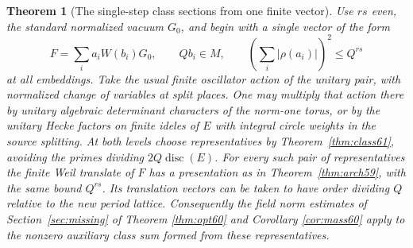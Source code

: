 \documentclass[a4paper,11pt]{article}
\newtheorem{theorem}[proposition]{Theorem}
\theoremstyle{definition}
\theoremstyle{remark}
\numberwithin{equation}{section}
\begin{document}
\begin{theorem}[The single-step class sections from one finite vector]\label{thm:one61}
Use \(rs\) even, the standard normalized vacuum \(G_0\), and
begin with a single vector of the form
\[
       F=\sum_i a_i W(b_i)G_0,\qquad Q b_i\in M,\qquad
                  \left(\sum_i|\rho(a_i)|\right)^2\le Q^{rs}
\]
at all embeddings. Take the usual finite oscillator action of
the unitary pair, with normalized change of variables at split
places. One may multiply that action there by unitary algebraic
determinant characters of the norm-one torus, or by the unitary
Hecke factors on finite ideles of \(E\) with integral circle
weights in the source splitting. At both levels choose representatives by
Theorem~\ref{thm:class61}, avoiding the primes dividing
\(2Q\operatorname{disc}(E)\). For every such pair of representatives
the finite Weil translate of \(F\) has a presentation as in
Theorem~\ref{thm:arch59}, with the same bound \(Q^{rs}\).
Its translation vectors can be taken to have order dividing
\(Q\) relative to the new period lattice. Consequently the
field norm estimates of Section~\ref{sec:missing} of
Theorem \ref{thm:opt60} and Corollary \ref{cor:mass60} apply to the nonzero auxiliary class sum
formed from these representatives.
\end{theorem}
\end{document}
